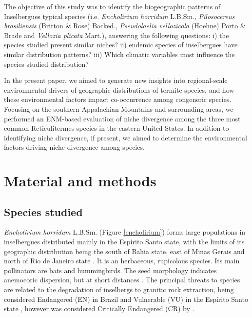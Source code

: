 
The objective of this study was to identify the biogeographic patterns of Inselbergues typical species (i.e. \textit{Encholirium horridum} L.B.Sm., \textit{Pilosocereus brasiliensis} (Britton & Rose) Backed., \textit{Pseudolaelia vellozicola} (Hoehne) Porto & Brade and \textit{Vellozia plicata} Mart.), answering the following questions: i) the species studied present similar niches? ii) endemic species of inselbergues have similar distribution patterns? iii) Which climatic variables most influence the species studied distribution? 


%
In the present paper, we aimed to generate new insights into regional-scale environmental drivers of geographic distributions of termite species, and how these environmental factors impact co-occurrence among congeneric species. Focusing on the southern Appalachian Mountains and surrounding areas, we performed an ENM-based evaluation of niche divergence among the three most common Reticulitermes species in the eastern United States. In addition to identifying niche divergence, if present, we aimed to determine the environmental factors driving niche divergence among species.
%


\section{Material and methods}
\label{mat_met}

\subsection{Species studied}

\textit{Encholirium horridum} L.B.Sm. (Figure \ref{encholirium}) forms large populations in inselbergues distributed mainly in the Espírito Santo state, with the limits of its geographic distribution being the south of Bahia state, east of Minas Gerais and north of Rio de Janeiro state \citep{hmeljevski2017PlantPopulationsDistinct}. It is an herbaceous, rupicolous species. Its main pollinators are bats and hummingbirds. The seed morphology indicates anemocoric dispersion, but at short distances \citep{hmeljevski2015PatternsGeneFlow}. The principal threats to species are related to the degradation of inselbergs to granitic rock extraction, being considered Endangered (EN) in Brazil \citep{martinelli2013LivroVermelhoFlora} and Vulnerable (VU) in the Espírito Santo state \citep{simonelli2007EspeciesFloraAmeacadas}, however was considered Critically Endangered (CR) by \cite{forzza2003EncholiriumPitcairnioideaeBromeliaceaeConhecimento}.

